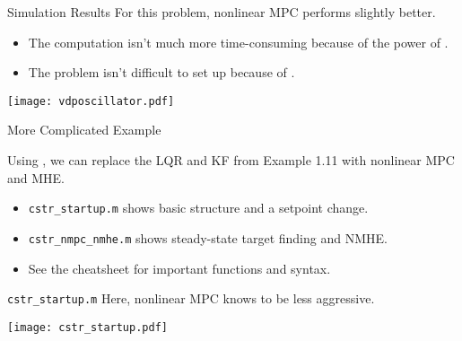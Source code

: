 \documentclass[xcolor=dvipsnames,handout]{beamer}
\begin{document}
\begin{frame}{Simulation Results}
    For this problem, nonlinear MPC performs slightly better.
    \begin{itemize}
        \item The computation isn't much more time-consuming because of the power of \casadi.
        \item The problem isn't difficult to set up because of \mpctools.
    \end{itemize}
    \begin{center}
        \texttt{[image: vdposcillator.pdf]}
    \end{center}
\end{frame}

\begin{frame}{More Complicated Example}

Using \mpctools{}, we can replace the LQR and KF from Example 1.11 with nonlinear MPC and MHE.

\begin{itemize}
    \item \texttt{cstr\_startup.m} shows basic structure and a setpoint change.
    \item \texttt{cstr\_nmpc\_nmhe.m} shows steady-state target finding and NMHE.
    \item See the cheatsheet for important functions and syntax.
\end{itemize}

\end{frame}

\begin{frame}{\texttt{cstr\_startup.m}}
    Here, nonlinear MPC knows to be less aggressive.
    \begin{center}
        \texttt{[image: cstr\_startup.pdf]}
     \end{center}
\end{frame}
\end{document}
